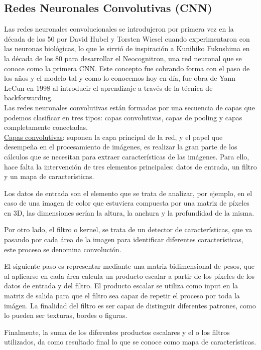 \subsection{Redes Neuronales Convolutivas (CNN)}

Las redes neuronales convolucionales se introdujeron por primera vez en la década de los 50 por David Hubel y Torsten Wiesel cuando experimentaron con las neuronas biológicas, lo que le sirvió de inspiración a Kunihiko Fukushima en la década de los 80 para desarrollar el Neocognitron, una red neuronal que se conoce como la primera CNN. Este concepto fue cobrando forma con el paso de los años y el modelo tal y como lo conocemos hoy en día, fue obra de Yann LeCun en 1998 al introducir el aprendizaje a través de la técnica de backforwarding.	\\

Las redes neuronales convolutivas están formadas por una secuencia de capas que podemos clasificar en tres tipos: capas convolutivas, capas de pooling y capas completamente conectadas.\\ 

\underline{Capas convolutivas}: suponen la capa principal de la red, y el papel que desempeña en el procesamiento de imágenes, es realizar la gran parte de los cálculos que se necesitan para extraer características de las imágenes. Para ello, hace falta la intervención de tres elementos principales: datos de entrada, un filtro y un mapa de características. 

Los datos de entrada son el elemento que se trata de analizar, por ejemplo, en el caso de una imagen de color que estuviera compuesta por una matriz de píxeles en 3D, las dimensiones serían la altura, la anchura y la profundidad de la misma. 

Por otro lado, el filtro o kernel, se trata de un detector de características, que va pasando por cada área de la imagen para identificar diferentes características, este proceso se denomina convolución. 

El siguiente paso es representar mediante una matriz bidimensional de pesos, que al aplicarse en cada área calcula un producto escalar a partir de los píxeles de los datos de entrada y del filtro. El producto escalar se utiliza como input en la matriz de salida para que el filtro sea capaz de repetir el proceso por toda la imágen. La finalidad del filtro es ser capaz de distinguir diferentes patrones, como lo pueden ser texturas, bordes o figuras. 

Finalmente, la suma de los diferentes productos escalares y el o los filtros utilizados, da como resultado final lo que se conoce como mapa de características. 

